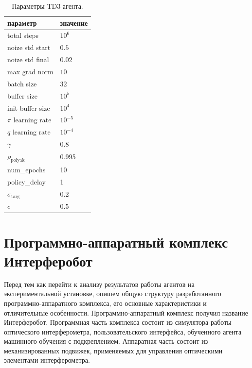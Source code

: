 \begin{table} [htbp]
    \centering
    \begin{threeparttable}%
        \caption{Параметры TD3 агента.}\label{tab:td3_params}%
        \begin{tabular}{| p{5cm} || p{5cm} |}
            \hline
            \hline
            параметр & значение \\
            \hline
            total steps & $10^6$ \\
            noize std start & $0.5$ \\
            noize std final & $0.02$ \\
            max grad norm & $10$ \\
            batch size & 32 \\
            buffer size & $10^5$ \\
            init buffer size & $10^4$ \\
            $\pi$ learning rate & $10^{-5}$ \\
            $q$ learning rate & $10^{-4}$ \\
            $\gamma$ & 0.8 \\
            $\rho_{\mathrm{polyak}}$ & 0.995 \\
            num\_epochs & 10  \\
            policy\_delay & 1 \\
            $\sigma_{\mathrm{targ}}$ & 0.2 \\
            $c$ & 0.5 \\
            \hline
            \hline
        \end{tabular}
    \end{threeparttable}
\end{table}

        

\section{Программно-аппаратный комплекс Интерферобот}

Перед тем как перейти к анализу результатов работы агентов на экспериментальной установке, опишем общую структуру разработанного программно-аппаратного комплекса, его основные характеристики и отличительные особенности. Программно-аппаратный комплекс получил название Интерферобот. Программная часть комплекса состоит из симулятора работы оптического интерферометра, пользовательского интерфейса, обученного агента машинного обучения с подкреплением. Аппаратная часть состоит из механизированных подвижек, применяемых для управления оптическими элементами интерферометра. 

